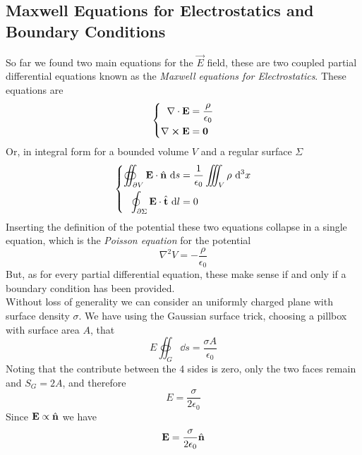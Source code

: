 \documentclass[../electromagnetism]{subfiles}
\begin{document}
\subsection{Maxwell Equations for Electrostatics and Boundary Conditions}
So far we found two main equations for the $\vec{E}$ field, these are two coupled partial differential equations known as the \textit{Maxwell equations for Electrostatics}. These equations are
\begin{equation}
	\left\{ \begin{aligned}
			\nabla\cdot\mathbf{E}&=\frac{\rho}{\epsilon_0}\\
			\nabla\cross\mathbf{E}&=\mathbf{0}
	\end{aligned}\right.
	\label{eq:maxwes}
\end{equation}
Or, in integral form for a bounded volume $V$ and a regular surface $\Sigma$
\begin{equation}
	\left\{ \begin{aligned}
			\oiint_{\partial V}\mathbf{E}\cdot\hat{\mathbf{n}}\ \mathrm{d} s&=\frac{1}{\epsilon_0}\iiint_V\rho\ \mathrm{d}^3x\\
			\oint_{\partial\Sigma} \mathbf{E}\cdot\hat{\mathbf{t}}\ \mathrm{d} l&=0
	\end{aligned}\right.
	\label{eq:maxwesint}
\end{equation}
Inserting the definition of the potential these two equations collapse in a single equation, which is the \textit{Poisson equation} for the potential
\begin{equation}
	\nabla^2V=-\frac{\rho}{\epsilon_0}
	\label{eq:poissoneq}
\end{equation}
But, as for every partial differential equation, these make sense if and only if a boundary condition has been provided.\\
Without loss of generality we can consider an uniformly charged plane with surface density $\sigma$. We have using the Gaussian surface trick, choosing a pillbox with surface area $A$, that
\begin{equation*}
	E\oiint_G\dd s=\frac{\sigma A}{\epsilon_0}
\end{equation*}
Noting that the contribute between the 4 sides is zero, only the two faces remain and $S_G=2A$, and therefore
\begin{equation}
	E=\frac{\sigma}{2\epsilon_0}
	\label{eq:efieldplane}
\end{equation}
Since $\mathbf{E}\propto\hat{\mathbf{n}}$ we have
\begin{equation}
	\mathbf{E}=\frac{\sigma}{2\epsilon_0}\hat{\mathbf{n}}
	\label{eq:efieldplanevec}
\end{equation}
\end{document}
